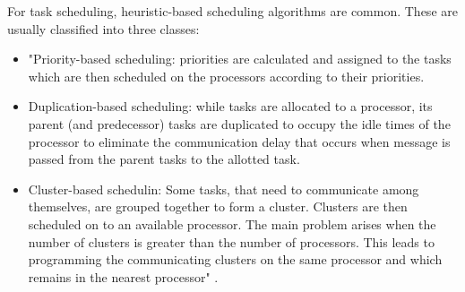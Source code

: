 \documentclass[conference]{IEEEtran}
\begin{document}
For task scheduling, heuristic-based scheduling algorithms are common. These are usually classified into three classes:

\begin{itemize}
    \item "Priority-based scheduling: priorities are calculated and assigned to the tasks which are then scheduled on the processors according to their priorities.
    \item Duplication-based scheduling: while tasks are allocated to a processor, its parent (and predecessor) tasks are duplicated to occupy the idle times of the processor to eliminate the communication delay that occurs when message is passed from the parent tasks to the allotted task.
    \item Cluster-based schedulin: Some tasks, that need to communicate among themselves, are grouped together to form a cluster. Clusters are then scheduled on to an available processor. The main problem arises when the number of clusters is greater than the number of processors. This leads to programming the communicating clusters on the same processor and which remains in the nearest processor" \cite{AbdallahGB24}.
\end{itemize}
\end{document}
